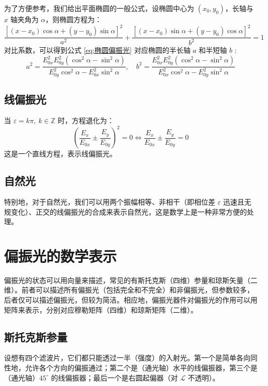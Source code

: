 \documentclass[UTF8]{report}
\def\Z{\mathbb{Z}}
\theoremstyle{MyLineTheoremStyle} %
\theoremstyle{MyBlockTheoremStyle} %
\theoremstyle{MySubsubsectionStyle} %
\begin{document}
为了方便参考，我们给出平面椭圆的一般公式，设椭圆中心为 $(x_0, y_0)$，长轴与 $x$ 轴夹角为 $\alpha$，则椭圆方程为：
\begin{equation}
\frac{\left[(x - x_0) \cos \alpha + (y - y_0) \sin \alpha \right]^2}{a^2} + \frac{\left[(x - x_0) \sin \alpha + (y - y_0) \cos \alpha  \right]^2}{b^2} = 1
\end{equation}
对比系数，可以得到公式 \ref{eq:椭圆偏振光} 对应椭圆的半长轴 $a$ 和半短轴 $b$ :
\begin{equation}
a^2 = \frac{E_{0x}^2E_{0y}^2 \left(\cos^2 \alpha - \sin^2 \alpha\right)}{E_{0y}^2\cos^2 \alpha  -  E_{0x}^2\sin^2 \alpha},\quad 
b^2 = \frac{E_{0x}^2E_{0y}^2 \left(\cos^2 \alpha - \sin^2 \alpha\right)}{E_{0x}^2\cos^2 \alpha  -  E_{0y}^2\sin^2 \alpha}
\end{equation}

\subsection{线偏振光}
当 $\varepsilon = k \pi,\  k \in \Z$ 时，方程退化为：
\begin{equation}
\left( \frac{E_x}{E_{0x}} \pm \frac{E_y}{E_{0y}} \right)^2 = 0 \Longleftrightarrow \frac{E_x}{E_{0x}} \pm \frac{E_y}{E_{0y}} = 0
\end{equation}
这是一个直线方程，表示线偏振光。

\subsection{自然光}
特别地，对于自然光，我们可以用两个振幅相等、非相干（即相位差 $\varepsilon$ 迅速且无规变化）、正交的线偏振光的合成来表示自然光，这是数学上是一种非常方便的处理。

\section{偏振光的数学表示}

偏振光的状态可以用向量来描述，常见的有斯托克斯（四维）参量和琼斯矢量（二维）。前者可以描述所有偏振光（包括完全和不完全）和非偏振光，但参数较多，后者仅可以描述偏振光，但较为简洁。相应地，偏振光器件对偏振光的作用可以用矩阵来表示，分别对应穆勒矩阵（四维）和琼斯矩阵（二维）。

\subsection{斯托克斯参量}
设想有四个滤波片，它们都只能透过一半（强度）的入射光。第一个是简单各向同性地，允许各个方向的偏振通过；第二个是（通光轴）水平的线偏振器，第三个是（通光轴）$45^\circ$ 的线偏振器；最后一个是右圆起偏器（对 $\mathscr{L}$ 不透明）。
\end{document}
